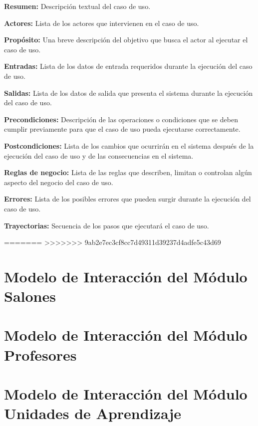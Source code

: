 \begin{objetivos}
	\item {\bf Resumen:} Descripción textual del caso de uso.
	\item {\bf Actores:} Lista de los actores que intervienen en el caso de uso.
	\item {\bf Propósito:} Una breve descripción del objetivo que busca el actor al ejecutar el caso de uso.
	\item {\bf Entradas:} Lista de los datos de entrada requeridos durante la ejecución del caso de uso.
	\item {\bf Salidas:} Lista de los datos de salida que presenta el sistema durante la ejecución del caso de uso.
	\item {\bf Precondiciones:} Descripción de las operaciones o condiciones que se deben cumplir previamente para que el caso de uso pueda ejecutarse correctamente.
	\item {\bf Postcondiciones:} Lista de los cambios que ocurrirán en el sistema después de la ejecución del caso de uso y de las consecuencias en el sistema.
	\item {\bf Reglas de negocio:} Lista de las reglas que describen, limitan o controlan algún aspecto del negocio del caso de uso.
	\item {\bf Errores:} Lista de los posibles errores que pueden surgir durante la ejecución del caso de uso.
	\item {\bf Trayectorias:} Secuencia de los pasos que ejecutará el caso de uso.
\end{objetivos}

=======
>>>>>>> 9ab2e7ec3cf8cc7d49311d39237d4adfe5c43d69

\newpage 
\section{Modelo de Interacción del Módulo Salones}
\section{Modelo de Interacción del Módulo Profesores}
\section{Modelo de Interacción del Módulo Unidades de Aprendizaje}


